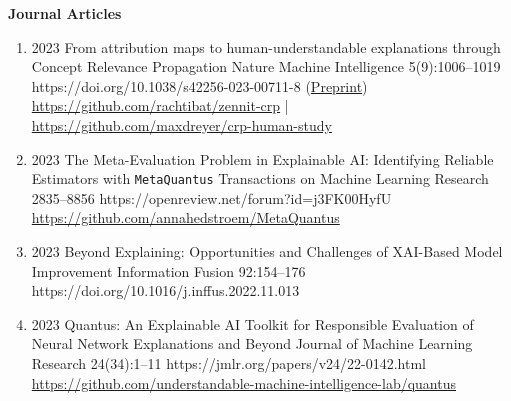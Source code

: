 \vspace{5mm}
\headedsection %
{\bf Journal Articles}{ }
{
\begin{enumerate}

    \item {}
                        {2023}
                        {From attribution maps to human-understandable explanations through Concept Relevance Propagation}
                        {Nature Machine Intelligence}
                        {5(9):1006--1019}
                        {https://doi.org/10.1038/s42256-023-00711-8}
                        {(\href{https://arxiv.org/abs/2206.03208}{Preprint})\\
                            \href{https://github.com/rachtibat/zennit-crp}{https://github.com/rachtibat/zennit-crp} |
                            \href{https://github.com/maxdreyer/crp-human-study}{https://github.com/maxdreyer/crp-human-study}
                        }

    \item {}
                        {2023}
                        {The Meta-Evaluation Problem in Explainable AI: Identifying Reliable Estimators with \texttt{MetaQuantus}}
                        {Transactions on Machine Learning Research}
                        {2835--8856}
                        {https://openreview.net/forum?id=j3FK00HyfU}
                        {\\\href{https://github.com/annahedstroem/MetaQuantus}{https://github.com/annahedstroem/MetaQuantus}}

    \item {}
                        {2023}
                        {Beyond Explaining: Opportunities and Challenges of XAI-Based Model Improvement}
                        {Information Fusion}
                        {92:154--176}
                        {https://doi.org/10.1016/j.inffus.2022.11.013}

    \item {}
                        {2023}
                        {Quantus: An Explainable AI Toolkit for Responsible Evaluation of Neural Network Explanations and Beyond}
                        {Journal of Machine Learning Research}
                        {24(34):1--11}
                        {https://jmlr.org/papers/v24/22-0142.html}
                        {\\\href{https://github.com/understandable-machine-intelligence-lab/quantus}{https://github.com/understandable-machine-intelligence-lab/quantus}}


\end{enumerate}}
